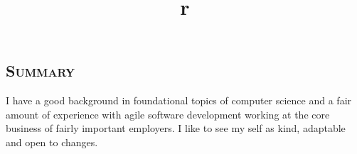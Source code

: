 \hypersetup{backref,pdfpagemode=Full,colorlinks=true,backref}
\addtolength{\oddsidemargin}{-0.43in}
\addtolength{\voffset}{-0.30in}
\addtolength{\textwidth}{1.00in} \addtolength{\textheight}{1.50in}
\renewcommand{\namefont}{\LARGE\emph}
\def\Cplusplus{{\rm C\raise.5ex\hbox{\small ++}}}
\def\CSharp{{\rm C\raise.5ex\hbox{\small \#}}}
\def\first{{\raise.5ex\hbox{\small st}}}
\def\second{{\raise.5ex\hbox{\small nd}}}
\def\third{{\raise.5ex\hbox{\small rd}}}
\def\fourth{{\raise.5ex\hbox{\small th}}}

\address{federicoviscomi@gmail.com \ \ \ \ \ +447801273266 \ \ \ \ \ \ Updated \today}
\begin{resume}
\section{\textsc{Summary}}
I have a good background in foundational topics of computer science
and a fair amount of experience with agile software development working at the core business of fairly important employers.
I like to see my self as kind, adaptable and open to changes.

\begin{formatb}
\title{r}\\
\\
\body\\
\end{formatb}


\end{resume}
